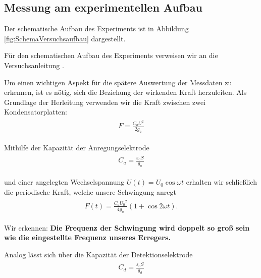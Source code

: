 \subsection{Messung am experimentellen Aufbau}

Der schematische Aufbau des Experiments ist in Abbildung \ref{fig:SchemaVersuchsaufbau} dargestellt.

Für den schematischen Aufbau des Experiments verweisen wir an die Versuchsanleitung \cite{Anleitung}.

Um einen wichtigen Aspekt für die spätere Auswertung der Messdaten zu erkennen, ist es nötig, sich die Beziehung der wirkenden Kraft herzuleiten.
Als Grundlage der Herleitung verwenden wir die Kraft zwischen zwei Kondensatorplatten:
\begin{align}
    \label{eq:KraftKondensatorplatten}
    \begin{split}
        F = \frac{C_a U^2}{2 g_a}
    \end{split}
\end{align}

Mithilfe der Kapazität der Anregungselektrode
\begin{align}
    \label{eq:KapazitaetAnregungselektrode}
    \begin{split}
        C_a = \frac{\varepsilon_0 S}{g_a}
    \end{split}
\end{align}

und einer angelegten Wechselspannung $U(t) = U_0 \cos \omega t$ erhalten wir schließlich die periodische Kraft, welche unsere Schwingung anregt
\begin{align}
    \label{eq:PeriodischeKraft}
    \begin{split}
        F \left( t \right) = \frac{C_a {U_0}^2}{4 g_a} \left( 1 + \cos 2 \omega t \right).
    \end{split}
\end{align}

Wir erkennen: \textbf{Die Frequenz der Schwingung wird doppelt so groß sein wie die eingestellte Frequenz unseres Erregers.}

Analog lässt sich über die Kapazität der Detektionselektrode
\begin{align}
    \label{eq:KapazitaetDetektionselektrode}
    \begin{split}
        C_d = \frac{\varepsilon_0 S}{g_d}
    \end{split}
\end{align}

